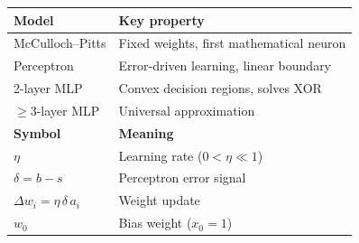 \documentclass[12pt,a4paper]{article}
\begin{document}
\vspace{1em}
\begin{tcolorbox}[colback=gray!5, colframe=gray!50!black,
  title={\bfseries Session 03 -- Quick Reference Card}]
\begin{center}
\begin{tabular}{ll}
\toprule
\textbf{Model} & \textbf{Key property} \\
\midrule
McCulloch--Pitts & Fixed weights, first mathematical neuron \\
Perceptron & Error-driven learning, linear boundary \\
2-layer MLP & Convex decision regions, solves XOR \\
$\geq$3-layer MLP & Universal approximation \\
\midrule
\textbf{Symbol} & \textbf{Meaning} \\
\midrule
$\eta$ & Learning rate ($0 < \eta \ll 1$) \\
$\delta = b - s$ & Perceptron error signal \\
$\Delta w_i = \eta\,\delta\,a_i$ & Weight update \\
$w_0$ & Bias weight ($x_0 = 1$) \\
\bottomrule
\end{tabular}
\end{center}
\end{tcolorbox}

\end{document}
